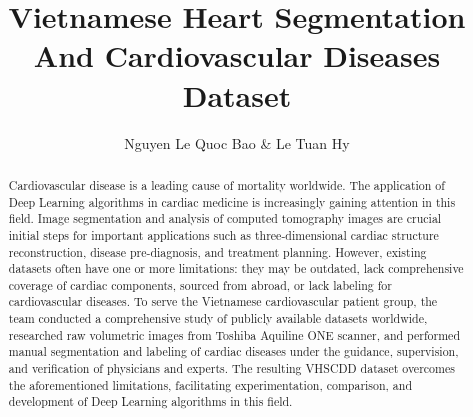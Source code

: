 \documentclass{article}
\title{Vietnamese Heart Segmentation \\ And Cardiovascular Diseases Dataset}
\author{Nguyen Le Quoc Bao \& Le Tuan Hy}
\begin{document}
\maketitle

\begin{center}
\begin{minipage}{0.95\textwidth}
\setlength{\leftskip}{3.5cm} 
\setlength{\rightskip}{3.5cm}
\begin{abstract}
    Cardiovascular disease is a leading cause of mortality worldwide. The application of Deep Learning algorithms in cardiac medicine is increasingly gaining attention in this field. Image segmentation and analysis of computed tomography images are crucial initial steps for important applications such as three-dimensional cardiac structure reconstruction, disease pre-diagnosis, and treatment planning. However, existing datasets often have one or more limitations: they may be outdated, lack comprehensive coverage of cardiac components, sourced from abroad, or lack labeling for cardiovascular diseases. To serve the Vietnamese cardiovascular patient group, the team conducted a comprehensive study of publicly available datasets worldwide, researched raw volumetric images from Toshiba Aquiline ONE scanner, and performed manual segmentation and labeling of cardiac diseases under the guidance, supervision, and verification of physicians and experts. The resulting VHSCDD dataset overcomes the aforementioned limitations, facilitating experimentation, comparison, and development of Deep Learning algorithms in this field.
\end{abstract}
\end{minipage}
\end{center}
\end{document}

